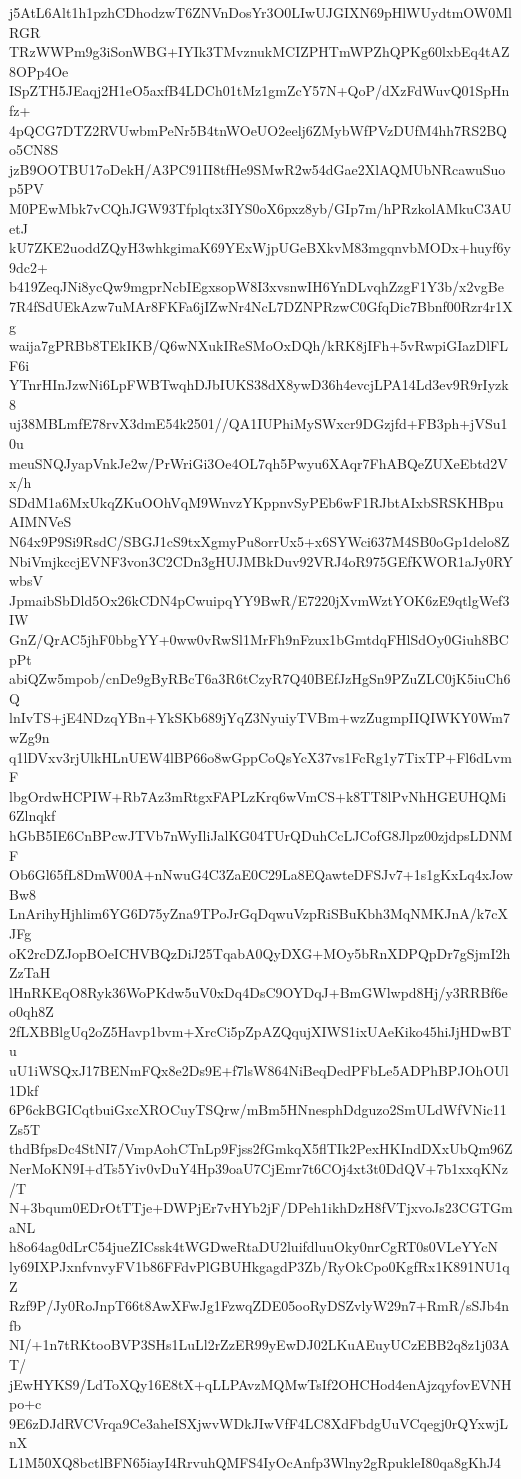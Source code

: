 j5AtL6Alt1h1pzhCDhodzwT6ZNVnDosYr3O0LIwUJGIXN69pHlWUydtmOW0MlRGR
TRzWWPm9g3iSonWBG+IYIk3TMvznukMCIZPHTmWPZhQPKg60lxbEq4tAZ8OPp4Oe
ISpZTH5JEaqj2H1eO5axfB4LDCh01tMz1gmZcY57N+QoP/dXzFdWuvQ01SpHnfz+
4pQCG7DTZ2RVUwbmPeNr5B4tnWOeUO2eelj6ZMybWfPVzDUfM4hh7RS2BQo5CN8S
jzB9OOTBU17oDekH/A3PC91II8tfHe9SMwR2w54dGae2XlAQMUbNRcawuSuop5PV
M0PEwMbk7vCQhJGW93Tfplqtx3IYS0oX6pxz8yb/GIp7m/hPRzkolAMkuC3AUetJ
kU7ZKE2uoddZQyH3whkgimaK69YExWjpUGeBXkvM83mgqnvbMODx+huyf6y9dc2+
b419ZeqJNi8ycQw9mgprNcbIEgxsopW8I3xvsnwIH6YnDLvqhZzgF1Y3b/x2vgBe
7R4fSdUEkAzw7uMAr8FKFa6jIZwNr4NcL7DZNPRzwC0GfqDic7Bbnf00Rzr4r1Xg
waija7gPRBb8TEkIKB/Q6wNXukIReSMoOxDQh/kRK8jIFh+5vRwpiGIazDlFLF6i
YTnrHInJzwNi6LpFWBTwqhDJbIUKS38dX8ywD36h4evcjLPA14Ld3ev9R9rIyzk8
uj38MBLmfE78rvX3dmE54k2501//QA1IUPhiMySWxcr9DGzjfd+FB3ph+jVSu10u
meuSNQJyapVnkJe2w/PrWriGi3Oe4OL7qh5Pwyu6XAqr7FhABQeZUXeEbtd2Vx/h
SDdM1a6MxUkqZKuOOhVqM9WnvzYKppnvSyPEb6wF1RJbtAIxbSRSKHBpuAIMNVeS
N64x9P9Si9RsdC/SBGJ1cS9txXgmyPu8orrUx5+x6SYWci637M4SB0oGp1delo8Z
NbiVmjkccjEVNF3von3C2CDn3gHUJMBkDuv92VRJ4oR975GEfKWOR1aJy0RYwbsV
JpmaibSbDld5Ox26kCDN4pCwuipqYY9BwR/E7220jXvmWztYOK6zE9qtlgWef3IW
GnZ/QrAC5jhF0bbgYY+0ww0vRwSl1MrFh9nFzux1bGmtdqFHlSdOy0Giuh8BCpPt
abiQZw5mpob/cnDe9gByRBcT6a3R6tCzyR7Q40BEfJzHgSn9PZuZLC0jK5iuCh6Q
lnIvTS+jE4NDzqYBn+YkSKb689jYqZ3NyuiyTVBm+wzZugmpIIQIWKY0Wm7wZg9n
q1lDVxv3rjUlkHLnUEW4lBP66o8wGppCoQsYcX37vs1FcRg1y7TixTP+Fl6dLvmF
lbgOrdwHCPIW+Rb7Az3mRtgxFAPLzKrq6wVmCS+k8TT8lPvNhHGEUHQMi6Zlnqkf
hGbB5IE6CnBPcwJTVb7nWyIliJalKG04TUrQDuhCcLJCofG8Jlpz00zjdpsLDNMF
Ob6Gl65fL8DmW00A+nNwuG4C3ZaE0C29La8EQawteDFSJv7+1s1gKxLq4xJowBw8
LnArihyHjhlim6YG6D75yZna9TPoJrGqDqwuVzpRiSBuKbh3MqNMKJnA/k7cXJFg
oK2rcDZJopBOeICHVBQzDiJ25TqabA0QyDXG+MOy5bRnXDPQpDr7gSjmI2hZzTaH
lHnRKEqO8Ryk36WoPKdw5uV0xDq4DsC9OYDqJ+BmGWlwpd8Hj/y3RRBf6eo0qh8Z
2fLXBBlgUq2oZ5Havp1bvm+XrcCi5pZpAZQqujXIWS1ixUAeKiko45hiJjHDwBTu
uU1iWSQxJ17BENmFQx8e2Ds9E+f7lsW864NiBeqDedPFbLe5ADPhBPJOhOUl1Dkf
6P6ckBGICqtbuiGxcXROCuyTSQrw/mBm5HNnesphDdguzo2SmULdWfVNic11Zs5T
thdBfpsDc4StNI7/VmpAohCTnLp9Fjss2fGmkqX5flTIk2PexHKIndDXxUbQm96Z
NerMoKN9I+dTs5Yiv0vDuY4Hp39oaU7CjEmr7t6COj4xt3t0DdQV+7b1xxqKNz/T
N+3bqum0EDrOtTTje+DWPjEr7vHYb2jF/DPeh1ikhDzH8fVTjxvoJs23CGTGmaNL
h8o64ag0dLrC54jueZICssk4tWGDweRtaDU2luifdluuOky0nrCgRT0s0VLeYYcN
ly69IXPJxnfvnvyFV1b86FFdvPlGBUHkgagdP3Zb/RyOkCpo0KgfRx1K891NU1qZ
Rzf9P/Jy0RoJnpT66t8AwXFwJg1FzwqZDE05ooRyDSZvlyW29n7+RmR/sSJb4nfb
NI/+1n7tRKtooBVP3SHs1LuLl2rZzER99yEwDJ02LKuAEuyUCzEBB2q8z1j03AT/
jEwHYKS9/LdToXQy16E8tX+qLLPAvzMQMwTsIf2OHCHod4enAjzqyfovEVNHpo+c
9E6zDJdRVCVrqa9Ce3aheISXjwvWDkJIwVfF4LC8XdFbdgUuVCqegj0rQYxwjLnX
L1M50XQ8bctlBFN65iayI4RrvuhQMFS4IyOcAnfp3Wlny2gRpukleI80qa8gKhJ4

